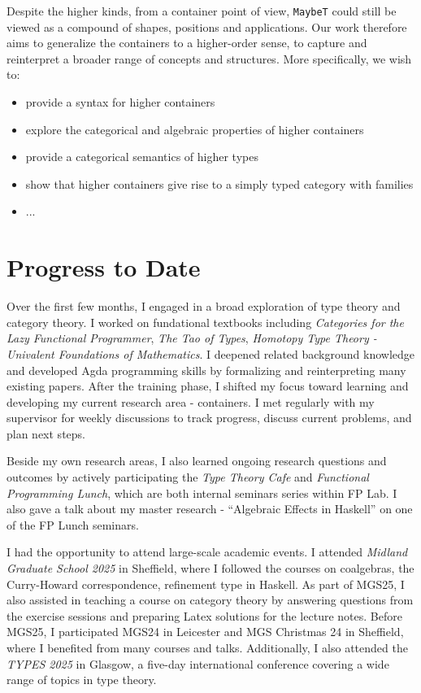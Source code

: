 Despite the higher kinds, from a container point of view, \texttt{MaybeT} could still be viewed as a compound of shapes, positions and applications. Our work therefore aims to generalize the containers to a higher-order sense, to capture and reinterpret a broader range of concepts and structures. More specifically, we wish to:

\begin{itemize}
  \item{provide a syntax for higher containers}
  \item{explore the categorical and algebraic properties of higher containers}
  \item{provide a categorical semantics of higher types}
  \item{show that higher containers give rise to a simply typed category with families}
  \item{...}
\end{itemize}

\section{Progress to Date}

Over the first few months, I engaged in a broad exploration of type theory and category theory. I worked on fundational textbooks including \textit{Categories for the Lazy Functional Programmer}, \textit{The Tao of Types}, \textit{Homotopy Type Theory - Univalent Foundations of Mathematics}. I deepened related background knowledge and developed Agda programming skills by formalizing and reinterpreting many existing papers. After the training phase, I shifted my focus toward learning and developing my current research area - containers. I met regularly with my supervisor for weekly discussions to track progress, discuss current problems, and plan next steps.

Beside my own research areas, I also learned ongoing research questions and outcomes by actively participating the \textit{Type Theory Cafe} and \textit{Functional Programming Lunch}, which are both internal seminars series within FP Lab. I also gave a talk about my master research - ``Algebraic Effects in Haskell'' on one of the FP Lunch seminars.

I had the opportunity to attend large-scale academic events. I attended \textit{Midland Graduate School 2025} in Sheffield, where I followed the courses on coalgebras, the Curry-Howard correspondence, refinement type in Haskell. As part of MGS25, I also assisted in teaching a course on category theory by answering questions from the exercise sessions and preparing Latex solutions for the lecture notes. Before MGS25, I participated MGS24 in Leicester and MGS Christmas 24 in Sheffield, where I benefited from many courses and talks. Additionally, I also attended the \textit{TYPES 2025} in Glasgow, a five-day international conference covering a wide range of topics in type theory.

